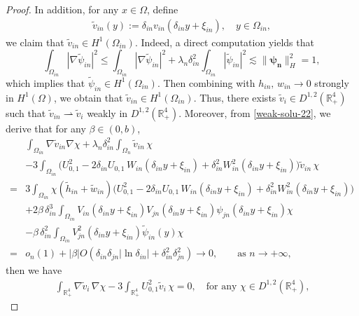 \documentclass[a4paper,reqno,11pt,oneside]{amsart}
\numberwithin{equation}{section}
\newcommand{\R}{\mathbb{R}}
\begin{document}
\begin{proof}
In addition, for any $x\in\Omega$, define
\begin{align}
    \label{trans-2}\widetilde{v}_{in}(y):=\delta_{in}v_{in}\left(\delta_{in} y+\xi_{in}\right),\quad y\in\Omega_{in},
\end{align} 
 we claim that $\widetilde{v}_{in}\in H^1\left(\Omega_{in}\right)$. Indeed, a direct computation yields that $$\displaystyle\int_{\Omega_{in}}|\nabla\widetilde{\psi}_{in}|^2\leq \displaystyle\int_{\Omega_{in}}|\nabla\widetilde{\psi}_{in}|^2+\lambda_n\delta_{in}^2\displaystyle\int_{\Omega_{in}}|\widetilde{\psi}_{in}|^2\lesssim\|\bm{\psi_n}\|^2_{H}=1,$$
which implies that $\widetilde{\psi}_{in}\in H^1\left(\Omega_{in}\right)$. Then combining with $h_{in},\,w_{in}\to 0$ strongly in $H^1(\Omega)$, we obtain that $\widetilde{v}_{in}\in H^1\left(\Omega_{in}\right)$. Thus, there exists $\widetilde{v}_{i}\in D^{1,2}(\R^4_+)$ such that $\widetilde{v}_{in}\rightharpoonup \widetilde{v}_i$ weakly in $D^{1,2}(\R^4_+)$.
Moreover, from \eqref{weak-solu-22}, we derive that for any   $\beta\in(0,b)$,
\begin{align*}
    &\displaystyle\int_{\Omega_{in}}\nabla \widetilde{v}_{in}\nabla{\chi}+\lambda_n\delta_{in}^2\displaystyle\int_{\Omega_n}\widetilde{v}_{in}\,{\chi} \nonumber\\&-3\displaystyle\int_{\Omega_{in}}\Big(U_{0,1}^2-2\delta_{in}U_{0,1}\,W_{in}\left(\delta_{in} y+\xi_{in}\right)+\delta_{in}^2W_{in}^2\left(\delta_{in} y+\xi_{in}\right)\Big)\widetilde{v}_{in}\,{\chi}\nonumber\\=&3\displaystyle\int_{\Omega_{in}}{\chi}\left(\widetilde{h}_{in}+\widetilde{w}_{in}\right)\Big(U_{0,1}^2-2\delta_{in}U_{0,1}\,W_{in}\left(\delta_{in} y+\xi_{in}\right)+\delta_{in}^2W_{in}^2\left(\delta_{in} y+\xi_{in}\right)\Big)\nonumber\\&+2\beta\,{\delta}^3_{in}\displaystyle\int_{\Omega_{in}}V_{in}\left(\delta_{in} y+\xi_{in}\right)V_{jn}\left(\delta_{in} y+\xi_{in}\right)\psi_{jn}\left(\delta_{in} y+\xi_{in}\right){\chi}\nonumber\\&-\beta\,{\delta}^2_{in}\displaystyle\int_{\Omega_{in}}V^2_{jn}\left(\delta_{in} y+\xi_{in}\right)\widetilde{\psi}_{in}(y){\chi}\nonumber\\=&o_n(1)+|\beta|O\left(\delta_{in}\delta_{jn}|\ln{\delta_{in}}|+\delta_{in}^2\delta_{jn}^2\right)\longrightarrow 0,\qquad\text{as $n\to+\infty$,}
\end{align*}
then we have
\begin{align*}
    \displaystyle\int_{\R^4_+}\nabla \widetilde{v}_i\,\nabla{\chi}-3\displaystyle\int_{\R^4_+}U^2_{0,1}\widetilde{v}_i\,{\chi}=0,\quad\text{for any $\chi\in D^{1,2}(\R^4_+)$,}

\end{align*}
\end{proof}
\end{document}

